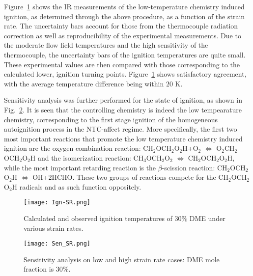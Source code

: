\documentclass[review,3p,times]{elsarticleUS}
\begin{document}
Figure~\ref{fig:Ign-SR} shows the IR measurements of the low-temperature chemistry induced ignition, as determined through the above procedure, as a function of the strain rate.  The uncertainty bars account for those from the thermocouple radiation correction as well as reproducibility of the experimental measurements.  Due to the moderate flow field temperatures and the high sensitivity of the thermocouple, the uncertainty bars of the ignition temperatures are quite small.  These experimental values are then compared with those corresponding to the calculated lower, ignition turning points.  Figure~\ref{fig:Ign-SR} shows satisfactory agreement, with the average temperature difference being within $20$ K.

Sensitivity analysis was further performed for the state of ignition, as shown in Fig.~\ref{fig:Sen_SR}.  It is seen that the controlling chemistry is indeed the low tempearature chemistry, corresponding to the first stage ignition of the homogeneous autoignition process in the NTC-affect regime.  More specifically, the first two most important reactions that promote the low temperature chemistry induced ignition are the oxygen combination reaction: CH$_2$OCH$_2$O$_2$H+O$_2$ $\Leftrightarrow$ O$_2$CH$_2$OCH$_2$O$_2$H and the isomerization reaction: CH$_3$OCH$_2$O$_2$ $\Leftrightarrow$ CH$_2$OCH$_2$O$_2$H, while the most important retarding reaction is the $\beta$-scission reaction: CH$_2$OCH$_2$O$_2$H $\Leftrightarrow$ OH+$2$HCHO.  These two groups of reactions compete for the CH$_2$OCH$_2$O$_2$H radicals and as such function oppositely.

\begin{figure}[t]
  \centering
  \scriptsize
  \vspace{-0.1in}
  \texttt{[image: Ign-SR.png]}
  \normalsize
  \vspace{-0.1in}
  \caption{Calculated and observed ignition temperatures of $30\%$ DME under various strain rates.}
  \label{fig:Ign-SR}
\end{figure} 

\begin{figure}[t]
  \centering
  \scriptsize
  \vspace{-0.1in}
  \texttt{[image: Sen\_SR.png]}
  \normalsize
  \vspace{-0.1in}
  \caption{Sensitivity analysis on low and high strain rate cases: DME mole fraction is $30\%$.}
  \label{fig:Sen_SR}
\end{figure}
\end{document}
